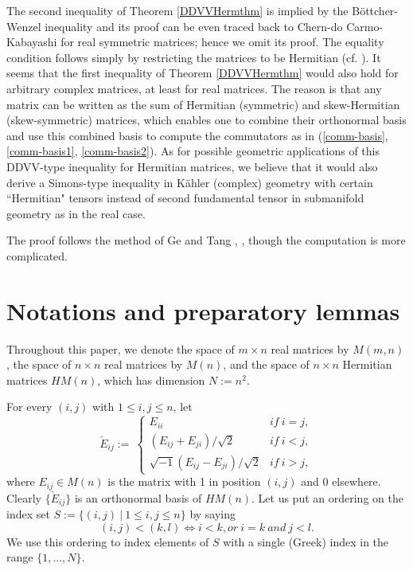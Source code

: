 \documentclass[a4paper,11pt]{amsart}
\numberwithin{equation}{section} \theoremstyle{plain}
\begin{document}
The second inequality of Theorem \ref{DDVVHermthm} is implied by the B\"{o}ttcher-Wenzel inequality
and its proof can be even traced back to Chern-do Carmo-Kabayashi \cite{CDK} for real symmetric matrices; hence we omit its proof.
The equality condition follows simply by restricting the matrices to be Hermitian (cf. \cite{BW08}).
It seems that the first inequality of Theorem \ref{DDVVHermthm} would also hold for arbitrary complex matrices, at least for real matrices. 
The reason is that any matrix can be written as the sum of Hermitian (symmetric) and skew-Hermitian (skew-symmetric) matrices,
which enables one to combine their orthonormal basis and use this combined basis to compute the commutators as in (\ref{comm-basis}, \ref{comm-basis1}, \ref{comm-basis2}).
As for possible geometric applications of this DDVV-type inequality for Hermitian matrices, we believe that it would also derive a Simons-type inequality in K\"{a}hler (complex) geometry with certain ``Hermitian" tensors instead of second fundamental tensor in submanifold geometry as in the real case.

The proof follows the method of Ge and Tang \cite{GT08}, \cite{Ge14}, though the computation is more complicated.
\section{Notations and preparatory lemmas}
Throughout this paper, we denote the space of $m\times n$ real matrices by $M(m,n)$, the space of $n\times n$ real matrices by $M(n)$, and the space of $n\times n$ Hermitian matrices $HM(n)$, which has dimension $N:=n^2$.

For every $(i,j)$ with $1\leq i,j\leq n$, let
$$
\check{E}_{ij}:=\
\begin{cases}
E_{ii}                                 &if\ i=j,\\
(E_{ij}+E_{ji})/\sqrt{2}               &if\ i<j,\\
\sqrt{-1}(E_{ij}-E_{ji})/\sqrt{2}      &if\ i>j,
\end{cases}
$$
where $E_{ij}\in M(n)$ is the matrix with 1 in position $(i,j)$ and 0 elsewhere. Clearly $\{\check{E}_{ij}\}$ is an orthonormal basis of $HM(n)$. Let us put an ordering on the index set $S:=\{(i,j)\ |\ 1\leq i,j\leq n\}$ by saying
\begin{equation}\label{eqno1}
(i,j)<(k,l)\Longleftrightarrow i<k, or \ i=k\ and \ j<l.
\end{equation}
We use this ordering to index elements of $S$ with a single (Greek) index in the range $\{1,...,N\}$.
\end{document}
